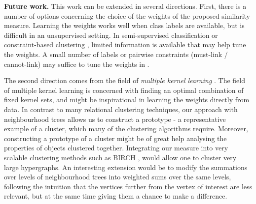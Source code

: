 \textbf{Future work.}
This work can be extended in several directions.
First, there is a number of options concerning the choice of the weights of the proposed similarity measure.
Learning the weights works well when class labels are available, but is difficult in an unsupervised setting.  
In semi-supervised classification or constraint-based clustering \citep{WagstaffCKC}, limited information is available that may help tune the weights.  A small number of labels or pairwise constraints (must-link / cannot-link) may suffice to tune the weights in \rcnt.

The second direction comes from the field of  \textit{multiple kernel learning} \citep{Gonen2011MKL}.
The field of multiple kernel learning is concerned with finding an optimal combination of fixed kernel sets, and might be inspirational in learning the weights directly from data.
In contrast to many relational clustering techniques, our approach with neighbourhood trees allows us to construct a prototype - a representative example of a cluster, which many of the clustering algorithms require.
Moreover, constructing a prototype of a cluster might be of great help analysing the properties of objects clustered together.
Integrating our measure into very scalable clustering methods such as BIRCH \citep{Zhang:1996}, would allow one to cluster very large hypergraphs.
An interesting extension would be to modify the summations over levels of neighbourhood trees into weighted sums over the same levels, following the intuition that the vertices further from the vertex of interest are less relevant, but at the same time giving them a chance to make a difference.



\cleardoublepage

